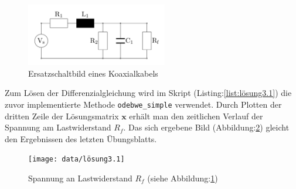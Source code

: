 \begin{figure}[h]
	\centering
	\includegraphics[width=0.55\textwidth]{data/koaxialkabel1}
	\caption{\centering Ersatzschaltbild eines Koaxialkabels}
	\label{fig:koaxial}
\end{figure}

Zum Lösen der Differenzialgleichung wird im Skript (Listing:\ref{list:lösung3.1}) die zuvor implementierte Methode \texttt{odebwe\_simple} verwendet. Durch Plotten der dritten Zeile der Lösungsmatrix $\mathbf{x}$ erhält man den zeitlichen Verlauf der Spannung am Lastwiderstand $R_f$. Das sich ergebene Bild (Abbildung:\ref{fig:lösung3.1}) gleicht den Ergebnissen des letzten Übungsblatts.

\begin{figure}[h]
	\centering
	\texttt{[image: data/lösung3.1]}
	\caption{\centering Spannung an Lastwiderstand $R_f$ (siehe Abbildung:\ref{fig:koaxial})}
	\label{fig:lösung3.1}
\end{figure}